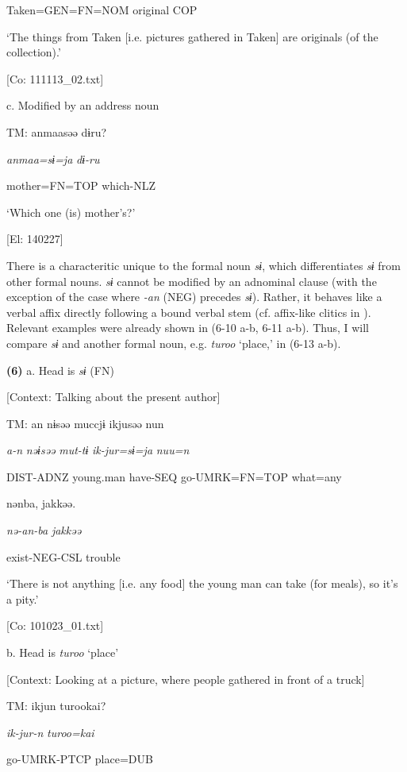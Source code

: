       Taken=GEN=FN=NOM  original  COP

      ‘The things from Taken [i.e. pictures gathered in Taken] are originals (of the collection).’

      [Co: 111113\_02.txt]

  c.  Modified by an address noun

    TM:  anmaasəə  dɨru?

      \textit{anmaa=sɨ=ja}  \textit{dɨ-ru}

      mother=FN=TOP  which-NLZ

      ‘Which one (is) mother’s?’

      [El: 140227]

There is a characteritic unique to the formal noun \textit{sɨ}, which differentiates \textit{sɨ} from other formal nouns. \textit{sɨ} cannot be modified by an adnominal clause (with the exception of the case where \textit{{}-an} (NEG) precedes \textit{sɨ}). Rather, it behaves like a verbal affix directly following a bound verbal stem (cf. affix-like clitics in ). Relevant examples were already shown in (6-10 a-b, 6-11 a-b). Thus, I will compare \textit{sɨ} and another formal noun, e.g. \textit{turoo} ‘place,’ in (6-13 a-b).

\textbf{(6)}  a. Head is \textit{sɨ} (FN)

  [Context: Talking about the present author]

  TM:  an  nɨsəə  muccjɨ  ikjusəə  nun

    \textit{a-n}  \textit{nəɨsəə}  \textit{mut-tɨ}  \textit{ik-jur=sɨ=ja}  \textit{nuu=n}

    DIST-ADNZ  young.man  have-SEQ  go-UMRK=FN=TOP  what=any

    nənba,  jakkəə.

    \textit{nə-an-ba}  \textit{jakkəə}

    exist-NEG-CSL  trouble

    ‘There is not anything [i.e. any food] the young man can take (for meals), so it’s a pity.’

    [Co: 101023\_01.txt]

  b. Head is \textit{turoo} ‘place’

  [Context: Looking at a picture, where people gathered in front of a truck]

  TM:  ikjun  turookai?

    \textit{ik-jur-n}  \textit{turoo=kai}

    go-UMRK-PTCP  place=DUB

